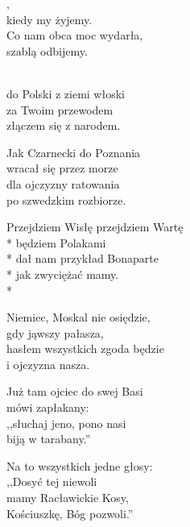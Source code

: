 \documentclass[a4paper,twoside,noinfo,nofrontmatter]{songbook}
\begin{document}
  
  \begin{lyrics}[multicol=true, longestline=Przejdziem Wisłę przejdziem Wartę]
    ,\\
    kiedy my żyjemy.\\
    Co nam obca moc wydarła,\\
    szablą odbijemy.
    
    \begin{chorus}
    \\
    do Polski z ziemi włoski\\
    za Twoim przewodem\\
    złączem się z narodem.
    \end{chorus}%
    
    Jak Czarnecki do Poznania\\
    wracał się przez morze\\
    dla ojczyzny ratowania\\
    po szwedzkim rozbiorze.
    
    \chorusref
    
    Przejdziem Wisłę przejdziem Wartę\\*
    będziem Polakami\\*
    dał nam przykład Bonaparte\\*
    jak zwyciężać mamy.\\*
    
    \chorusref
    
    Niemiec, Moskal nie osiędzie,\\
    gdy jąwszy pałasza,\\
    hasłem wszystkich zgoda będzie\\
    i ojczyzna nasza.

    \chorusref

    Już tam ojciec do swej Basi\\
    mówi zapłakany:\\
    ,,słuchaj jeno, pono nasi\\
    biją w tarabany.''

    \chorusref

    Na to wszystkich jedne głosy:\\
    ,,Dosyć tej niewoli\\
    mamy Racławickie Kosy,\\
    Kościuszkę, Bóg pozwoli.''
  \end{lyrics}
  
\end{document}
